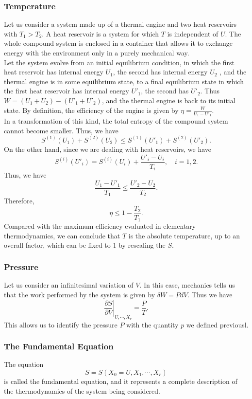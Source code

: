 \subsubsection{Temperature}
Let us consider a system made up of a thermal engine and two heat reservoirs with $T_1 > T_2$. A heat reservoir is a system for which $T$ is independent of $U$. The whole compound system is enclosed in a container that allows it to exchange energy with the environment only in a purely mechanical way. 
\\
Let the system evolve from an initial equilibrium condition, in which the first heat reservoir has internal energy $U_1$, the second has internal energy $U_2$ , and the thermal engine is in some equilibrium state, to a final equilibrium state in which the first heat reservoir has internal energy $U'_1$, the second has $U'_2$. Thus $W = (U_1 + U_2 ) - (U'_1 + U'_2)$, and the thermal engine is back to its initial state. By definition, the efficiency of the engine is given by $\eta = \frac{W}{U_1 - U'_1}$.
\\
In a transformation of this kind, the total entropy of the compound system cannot become smaller. Thus, we have
\[S^{(1)}(U_1) + S^{(2)}(U_2) \leq S^{(1)}(U'_1) + S^{(2)}(U'_2).\]
On the other hand, since we are dealing with heat reservoirs, we have
\[S^{(i)}(U'_i) = S^{(i)}(U_i) + \frac{U'_i - U_i}{T_i} , \quad i = 1,2.\]
Thus, we have
\[\frac{U_1 - U'_1}{T_1} \leq \frac{U'_2 - U_2}{T_2}.\]
Therefore,
\[\eta \leq 1 - \frac{T_2}{T_1}.\]
Compared with the maximum efficiency evaluated in elementary thermodynamics, we can conclude that $T$ is the absolute temperature, up to an overall factor, which can be fixed to $1$ by rescaling the $S$. 

\subsubsection{Pressure}
Let us consider an infinitesimal variation of $V$. In this case, mechanics tells us that the work performed by the system is given by $\delta W = PdV$. Thus we have
\[\left. \frac{\partial S}{\partial V} \right|_{U,\cdots,X_r} = \frac{P}{T}.\]
This allows us to identify the pressure $P$ with the quantity $p$ we defined previousl.


\subsubsection{The Fundamental Equation}
The equation
\[S = S(X_0 = U, X_1, \cdots, X_r)\]
is called the fundamental equation, and it represents a complete description of the thermodynamics of the system being considered.

